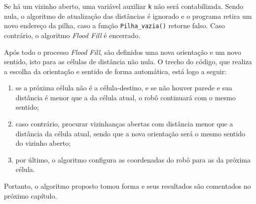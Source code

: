 	Se há um vizinho aberto, uma variável auxiliar \verb+k+ não será contabilizada. Sendo nula, o algoritmo de atualização das distâncias é ignorado e o programa retira um novo endereço da pilha, caso a função \verb+Pilha_vazia()+ retorne falso. Caso contrário, o algoritmo \emph{Flood Fill} é encerrado.
	
	Após todo o processo \emph{Flood Fill}, são definidos uma nova orientação e um novo sentido, isto para as células de distância não nula. O trecho do código, que realiza a escolha da orientação e sentido de forma automática, está logo a seguir:
	
\begin{enumerate}[leftmargin=2cm,label=\alph*)]
	\item se a próxima célula não é a célula-destino, e se não houver parede e sua distância é menor que a da célula atual, o robô continuará com o mesmo sentido;
	\item caso contrário, procurar vizinhanças abertas com distância menor que a distância da célula atual, sendo que a nova orientação será o mesmo sentido do vizinho aberto;
	\item por último, o algoritmo configura as coordenadas do robô para as da próxima célula.
\end{enumerate}

Portanto, o algoritmo proposto tomou forma e seus resultados são comentados no próximo capítulo.
%
%  
%  
%     

